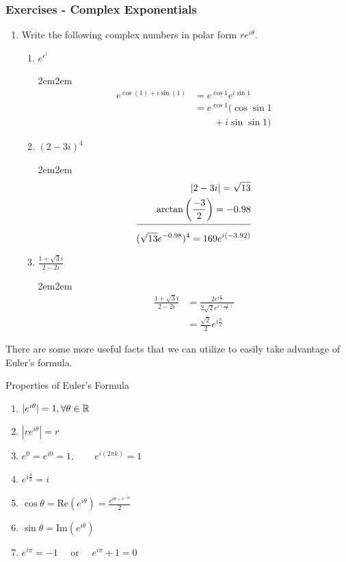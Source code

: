 \documentclass[10pt]{paper}
\newcommand{\gspc}{\vspace{0.13cm}} %
\newcommand{\cpr}[1]{\left(#1\right)}
\renewcommand{\Re}[1]{\text{Re}\left(#1\right)}
\renewcommand{\Im}[1]{\text{Im}\left(#1\right)}
\newcommand{\ahline}{\\[3pt]\hline\\[-8pt]}
\newenvironment{problem}[1]
  {\vspace{-0.1cm}\begin{coloredadjust}\begin{adjustwidth}{2em}{2em}#1}
  {
\end{adjustwidth}\end{coloredadjust}\gspc}
\begin{document}
\subsubsection{Exercises - Complex Exponentials}
\begin{enumerate}
  \item Write the following complex numbers in polar form $re^{i\theta}$.
  \begin{enumerate}
    \item $e^{e^i}$
    \begin{problem}
      \begin{align*}
        e^{\cos(1) + i\sin(1)}&= e^{\cos 1}e^{i\sin 1}\\
        &= e^{\cos 1}(\cos\sin 1 \\&\quad\quad+ i \sin\sin 1)
      \end{align*}
    \end{problem}
    \item $(2 - 3i)^4$
    \begin{problem}
      \begin{align*}
        |2 - 3i| = \sqrt{13}\\
        \arctan\cpr{\frac{-3}2} = -0.98\ahline
        (\sqrt{13}e^{-0.98})^4 = 169e^{i(-3.92)}
      \end{align*}
    \end{problem}
    \item $\frac{1+\sqrt 3i}{2-2i}$
    \begin{problem}
      \begin{align*}
      \frac{1+\sqrt 3i}{2-2i}&= \frac{2e^{i\frac{\pi}3}}{2\sqrt 2 e^{i\cpr{\frac{-\pi}4}}}\\
      &= \frac{\sqrt 2}2 e^{i\frac{\pi}2}
    \end{align*}
    \end{problem}
  \end{enumerate}
\end{enumerate}
There are some more useful facts that we can utilize to easily take advantage of Euler's formula.
\begin{theorem}{Properties of Euler's Formula}{}
  \begin{enumerate}
    \item $|e^{i\theta}|=1, \forall \theta \in \mathbb{R}$
    \item $|re^{i\theta}|=r$
    \item $e^0=e^{i0}=1,\quad\quad e^{i(2\pi k)}=1$
    \item $e^{i\frac{\pi}2}= i$
    \item $\cos\theta = \Re{e^{i\theta}}=\frac{e^{i\theta + e^{-i\theta}}}2$
    \item $\sin \theta = \Im{e^{i\theta}}$
    \item $e^{i\pi}=-1\quad\text{ or }\quad e^{i\pi}+1=0$
  \end{enumerate}
\end{theorem}
\end{document}
